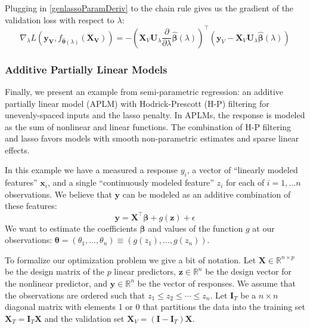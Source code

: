 \documentclass[12pt,letterpaper]{article}
\begin{document}
Plugging in \eqref{genlassoParamDeriv} to the chain rule gives us the gradient of the validation loss with respect to $\lambda$:
\begin{equation}
\nabla_{\lambda} L(\boldsymbol{y_V}, f_{\hat{\boldsymbol{\theta}}(\lambda)}(\boldsymbol{X_V})) = 
- \left (
\boldsymbol{X}_V \boldsymbol U_\lambda
\frac{\partial}{\partial \lambda} \hat{\boldsymbol \beta}(\lambda)
\right )^\top
\left (
\boldsymbol{y}_V - \boldsymbol{X}_V \boldsymbol U_\lambda \hat{\boldsymbol{\beta}} (\lambda)
\right )
\end{equation}

\subsubsection{Additive Partially Linear Models}\label{sec:aplm}

Finally, we present an example from semi-parametric regression: an additive partially linear model (APLM) with Hodrick-Prescott (H-P) filtering for unevenly-spaced inputs and the lasso penalty. In APLMs, the response is modeled as the sum of nonlinear and linear functions.  The combination of H-P filtering and lasso favors models with smooth non-parametric estimates and sparse linear effects.

In this example we have a measured a response $y_i$, a vector of ``linearly modeled features'' $\boldsymbol{x}_i$, and a single ``continuously modeled feature'' $z_i$ for each of $i=1,\ldots n$ observations. We believe that $\boldsymbol y$ can be modeled as an additive combination of these features:
\begin{equation}
\boldsymbol y = \boldsymbol X^\top \boldsymbol{\beta} + g(\boldsymbol z) + \epsilon
\end{equation}
We want to estimate the coefficients $\boldsymbol{\beta}$ and values of the function $g$ at our observations: $\boldsymbol{\theta} = (\theta_1, ..., \theta_n) \equiv (g(z_1), ..., g(z_n))$.

To formalize our optimization problem we give a bit of notation. Let $\boldsymbol{X} \in \mathbb{R}^{n \times p}$ be the design matrix of the $p$ linear predictors, $\boldsymbol{z} \in \mathbb{R}^n$ be the design vector for the nonlinear predictor, and $\boldsymbol{y} \in \mathbb{R}^n$ be the vector of responses. We assume that the observations are ordered such that $z_1 \le z_2 \le \cdots \le z_n$. Let $\boldsymbol{I}_T$ be a $n \times n$ diagonal matrix with elements 1 or 0 that partitions the data into the training set $\boldsymbol{X}_T= \boldsymbol{I}_T \boldsymbol{X}$ and the validation set $\boldsymbol{X}_V= (\boldsymbol{I} - \boldsymbol{I}_T) \boldsymbol{X}$.
\end{document}
